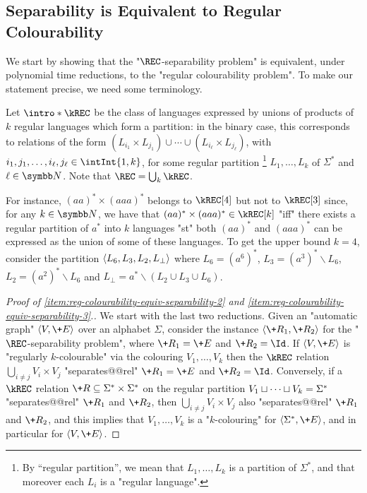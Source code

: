 \subsection{Separability is Equivalent to Regular Colourability}

We start by showing that the "$\REC$-separability problem" is equivalent,
under polynomial time reductions, to the "regular colourability problem". To make our statement precise, we need some terminology.

\AP Let $\intro*\kREC$ be the class of languages expressed by unions of products of $k$ regular languages which form a partition: in the binary case, this corresponds to
relations of the form $(L_{i_1} \times L_{j_1}) \cup \dotsb \cup (L_{i_\ell} \times L_{j_\ell})$, with $i_1,j_1,\dotsc,i_\ell, j_\ell \in \intInt{1,k}$, for some regular partition%
\footnote{By ``regular partition'',
we mean that $L_1, \dotsc, L_{k}$ is a partition of $\Sigma^*$, and that moreover
each $L_i$ is a "regular language".} $L_1, \dotsc, L_{k}$ of $\Sigma^*$ and $\ell \in \N$.
Note that $\REC = \bigcup_k \kREC$.

\begin{example}
    For instance, $(aa)^* \times (aaa)^*$ belongs to $\kREC[4]$ but not to $\kREC[3]$
    since, for any $k\in \N$, we have that $(aa)^* \times (aaa)^* \in \kREC[k]$ "iff"
    there exists a regular partition of $a^*$ into $k$ languages "st" both
    $(aa)^*$ and $(aaa)^*$ can be expressed as the union of some of these languages.
    To get the
    upper bound $k=4$, consider the partition $\langle L_6, L_3, L_2, L_\bot\rangle$ where $L_6 = (a^6)^*$,
    $L_3 = (a^3)^* \smallsetminus L_6$, $L_2 = (a^2)^* \smallsetminus L_6$ and $L_\bot = a^* \smallsetminus (L_2 \cup L_3 \cup L_6)$.
\end{example}

\regcolourabilityequivseparability%
   
\begin{proof}[Proof of \eqref{item:reg-colourability-equiv-separability-2} and
    \eqref{item:reg-colourability-equiv-separability-3}.]
    We start with the last two reductions.
    Given an "automatic graph" $\tup{V,\+E}$ over an alphabet $\Sigma$, consider the instance
    $\tup{\+R_1, \+R_2}$ for the "$\REC$-separability problem", where 
    $\+R_1 = \+E$ and $\+R_2 = \Id$. 
    If $\tup{V,\+E}$ is "regularly $k$-colourable" via the colouring $V_1, \dotsc, V_k$ then the $\kREC$ relation
    $\bigcup_{i \neq j} V_i \times V_j$ "separates@@rel" $\+R_1 = \+E$ and $\+R_2 = \Id$. 
    Conversely, if a $\kREC$ relation $\+R \subseteq \Sigma^* \times \Sigma^*$ on the regular 
    partition $V_1 \sqcup \dotsb \sqcup V_k = \Sigma^*$ "separates@@rel" $\+R_1$ and $\+R_2$, then $\bigcup_{i \neq j} V_i \times V_j$ also "separates@@rel" $\+R_1$ and $\+R_2$, and this implies that $V_1, \dotsc, V_k$ is a "$k$-colouring" for $\tup{\Sigma^*,\+E}$, and in particular
    for $\tup{V,\+E}$.
\end{proof}

